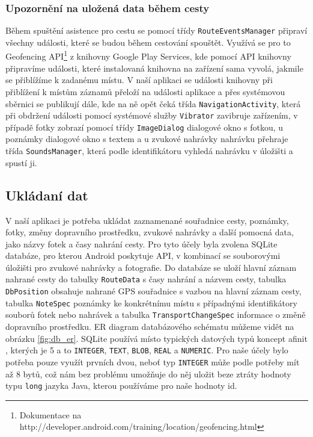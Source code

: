 \documentclass[czech,master,public,dept460,male,java,cpdeclaration]{diploma}
\begin{document}
\subsubsection{Upozornění na uložená data během cesty}
Během spuštění asistence pro cestu se pomocí třídy \texttt{RouteEventsManager} připraví všechny události,
které se budou během cestování spouštět. Využívá se pro to
Geofencing API\footnote{Dokumentace na http://developer.android.com/training/location/geofencing.html}
z knihovny Google Play Services, kde pomocí API knihovny připravíme události, které instalovaná knihovna
na zařízení sama vyvolá, jakmile se přiblížíme k zadanému místu. V naší aplikaci se události knihovny
při přiblížení k místům záznamů přeloží na události aplikace a přes systémovou sběrnici se publikují
dále, kde na ně opět čeká třída \texttt{NavigationActivity}, která při obdržení události pomocí
systémové služby \texttt{Vibrator} zavibruje zařízením, v případě fotky zobrazí pomocí třídy
\texttt{ImageDialog} dialogové okno s fotkou, u poznámky dialogové okno s textem a u zvukové nahrávky
nahrávku přehraje třída \texttt{SoundsManager}, která podle identifikátoru vyhledá nahrávku v úložišti
a spustí ji.

\subsection{Ukládaní dat}
V naší aplikaci je potřeba ukládat zaznamenané souřadnice cesty, poznámky, fotky, změny dopravního
prostředku, zvukové nahrávky a další pomocná data, jako názvy fotek a časy nahrání cesty. Pro tyto
účely byla zvolena SQLite databáze, pro kterou Android poskytuje API, v kombinací se souborovými úložišti
pro zvukové nahrávky a fotografie. Do databáze se uloží hlavní záznam nahrané cesty do tabulky \texttt{RouteData}
s časy nahrání a názvem cesty, tabulka \texttt{DbPosition} obsahuje nahrané GPS souřadnice s vazbou
na hlavní záznam cesty, tabulka \texttt{NoteSpec} poznámky ke konkrétnímu místu s případnými identifikátory
souborů fotek nebo nahrávek a tabulka \texttt{TransportChangeSpec} informace o změně dopravního prostředku.
ER diagram databázového schématu můžeme vidět na obrázku \ref{fig:db_er}. SQLite používá místo typických datových typů koncept afinit
\cite{sqlitetypes}, kterých je 5 a to \texttt{INTEGER}, \texttt{TEXT}, \texttt{BLOB}, \texttt{REAL} a \texttt{NUMERIC}.
Pro naše účely bylo potřeba pouze využít prvních dvou, neboť typ \texttt{INTEGER} může podle potřeby
mít až 8 bytů\cite{sqlitetypes}, což nám bez problému umožňuje do něj uložit beze ztráty hodnoty typu
\texttt{long} jazyka Java, kterou používáme pro naše hodnoty id.
\end{document}
